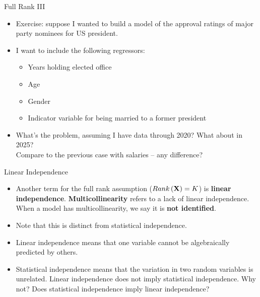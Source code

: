 \documentclass[english,xcolor={dvipsnames},aspectratio=169]{beamer}
\begin{document}
\begin{frame}{Full Rank III}
\begin{itemize}

	\item Exercise: suppose I wanted to build a model of the approval ratings of major party nominees 
	for US president. 

	\item I want to include the following regressors:
	\begin{itemize}
		\item Years holding elected office
		\item Age
		\item Gender
		\item Indicator variable for being married to a former president
	\end{itemize}

	\item What's the problem, assuming I have data through 2020? What about in 2025? \\ Compare to the previous case with salaries -- any difference? 



\end{itemize}
\end{frame}

\begin{frame}{Linear Independence}
\begin{itemize}

	\item Another term for the full rank assumption ($Rank\left({\bf X}\right)=K$) is {\bf linear independence}.
	 {\bf Multicollinearity} refers to a lack of linear independence. When a model has multicollinearity, we 
  	say it is {\bf not identified}. 

	\medskip
	\item Note that this is distinct from statistical independence. 

	\medskip
	\item Linear independence means that one variable cannot be algebraically predicted by others. 

	\medskip
	\item Statistical independence means that the variation in two random variables is unrelated.
	Linear independence does not imply statistical independence. Why not? Does statistical independence
	imply linear independence? 
\end{itemize}
\end{frame}
\end{document}
